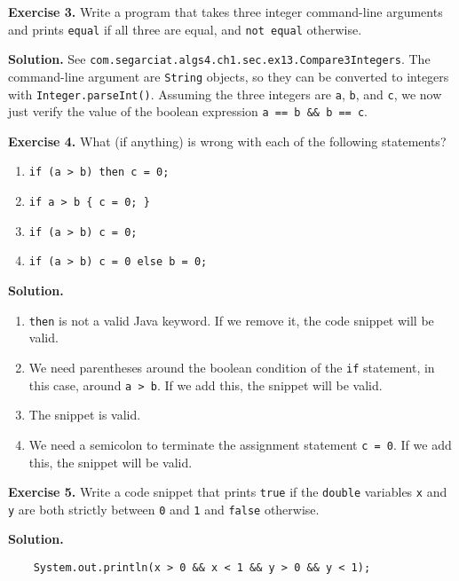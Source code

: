 \documentclass[12pt, a4paper]{article}
\newenvironment{ex}[2][Exercise]
{\par\medskip\noindent \textbf{#1 #2.}}
{\medskip}
\newenvironment{sol}[1][Solution]
{\par\medskip\noindent \textbf{#1.} }
{\medskip}
\begin{document}
	\begin{ex}{3}
		Write a program that takes three integer command-line arguments and prints
		\texttt{equal} if all three are equal, and \texttt{not equal} otherwise.
	\end{ex}
	\begin{sol}
		See \texttt{com.segarciat.algs4.ch1.sec.ex13.Compare3Integers}.
		The command-line argument are \texttt{String} objects, so they can be converted
		to integers with \texttt{Integer.parseInt()}. Assuming the three integers are
		\texttt{a}, \texttt{b}, and \texttt{c}, we now just verify the value of the
		boolean expression \texttt{a == b \&\& b == c}.
	\end{sol}
	\begin{ex}{4}
		What (if anything) is wrong with each of the following statements?
		\begin{enumerate}[label=(\alph*)]
			\item \texttt{if (a > b) then c = 0;}
			\item \texttt{if a > b \{ c = 0; \}}
			\item \texttt{if (a > b) c = 0;}
			\item \texttt{if (a > b) c = 0 else b = 0;}
		\end{enumerate}
	\end{ex}
	\begin{sol}
		\
		\begin{enumerate}[label=(\alph*)]
			\item \texttt{then} is not a valid Java keyword. If we remove it, the code snippet
			will be valid.
			\item We need parentheses around the boolean condition of the \texttt{if} statement,
			in this case, around \texttt{a > b}. If we add this, the snippet will be valid.
			\item The snippet is valid.
			\item We need a semicolon to terminate the assignment statement \texttt{c = 0}.
			If we add this, the snippet will be valid.
		\end{enumerate}
	\end{sol}
	\begin{ex}{5}
		Write a code  snippet that prints \texttt{true} if the \texttt{double} variables
		\texttt{x} and \texttt{y} are both strictly between \texttt{0} and \texttt{1}
		and \texttt{false} otherwise.
	\end{ex}
	\begin{sol}
		\
		\begin{lstlisting}
	System.out.println(x > 0 && x < 1 && y > 0 && y < 1);
		\end{lstlisting}
	\end{sol}
\end{document}
